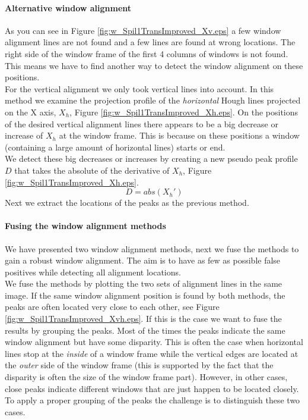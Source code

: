 \paragraph{Alternative window alignment}
\label{alternative}
As you can see in Figure \ref{fig:w_Spil1TransImproved_Xv.eps}
a few window alignment lines are not found and a few lines are found at wrong locations.
The right side of the window frame of the first 4 columns of windows is not found.
This means we have to find another way to detect the window alignment on these positions.\\

For the vertical alignment we only took vertical lines into account.
In this method we examine the projection profile of the \emph{horizontal} Hough lines
projected on the X axis, $X_h$, Figure \ref{fig:w_Spil1TransImproved_Xh.eps}.
On the positions of the desired vertical alignment lines there appears to be a 
big decrease or increase of $X_h$ at the window frame. This is because on these
positions a window (containing a large amount of horizontal lines) starts or
end.\\

We detect these big decreases or increases by creating a new pseudo peak profile
$D$ that takes the absolute of the derivative of $X_h$, Figure \ref{fig:w_Spil1TransImproved_Xh.eps}.
\[D = abs( X_{h}')\]
Next we extract the locations of the peaks as the previous method.

\paragraph{Fusing the window alignment methods}
We have presented two window alignment methods, next we fuse the methods to
gain a robust window alignment.
The aim is to have as few as possible false positives while detecting all alignment locations.\\

We fuse the methods by plotting the two sets of alignment lines in the same image.
If the same window alignment position is found by both methods, the peaks are often
located very close to each other, see Figure
\ref{fig:w_Spil1TransImproved_Xvh.eps}.  If this is the case we want to fuse the results by grouping the peaks.
Most of the times the peaks indicate the same window alignment but have
some disparity.  This is often the case when horizontal lines stop at the \emph{inside}
of a window frame while the vertical edges are located at the \emph{outer} side of the
window frame (this is supported by the fact that the disparity is often the size of the window frame part).  
However, in other cases, close peaks indicate different windows that are just happen to be
located closely.  To apply a proper grouping of the peaks the challenge is to
distinguish these two cases.\\

